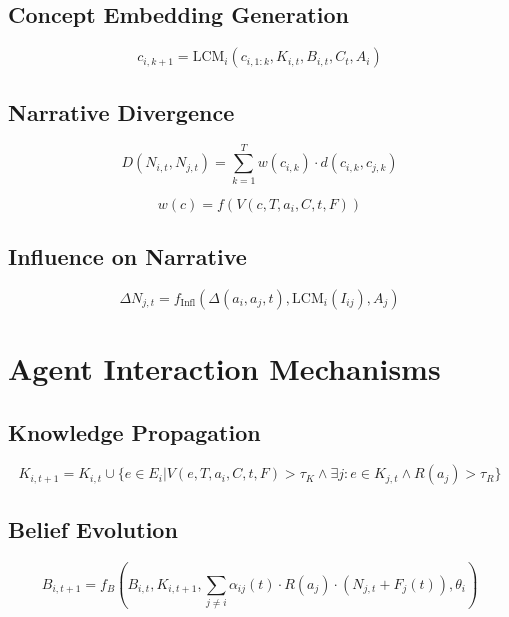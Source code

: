 \documentclass[12pt, a4paper]{article}
\begin{document}
\subsection{Concept Embedding Generation}
\begin{equation}
c_{i,k+1} = \text{LCM}_i(c_{i,1:k}, K_{i,t}, B_{i,t}, C_t, A_i)
\end{equation}

\subsection{Narrative Divergence}
\begin{equation}
D(N_{i,t}, N_{j,t}) = \sum_{k=1}^T w(c_{i,k}) \cdot d(c_{i,k}, c_{j,k})
\end{equation}

\begin{equation}
w(c) = f(V(c, T, a_i, C, t, F))
\end{equation}

\subsection{Influence on Narrative}
\begin{equation}
\Delta N_{j,t} = f_{\text{Infl}}(\Delta(a_i, a_j, t), \text{LCM}_i(I_{ij}), A_j)
\end{equation}

\section{Agent Interaction Mechanisms}

\subsection{Knowledge Propagation}
\begin{equation}
K_{i,t+1} = K_{i,t} \cup \{e \in E_i | V(e, T, a_i, C, t, F) > \tau_K \wedge \exists j: e \in K_{j,t} \wedge R(a_j) > \tau_R\}
\end{equation}

\subsection{Belief Evolution}
\begin{equation}
B_{i,t+1} = f_B(B_{i,t}, K_{i,t+1}, \sum_{j\neq i} \alpha_{ij}(t) \cdot R(a_j) \cdot (N_{j,t} + F_j(t)), \theta_i)
\end{equation}
\end{document}
